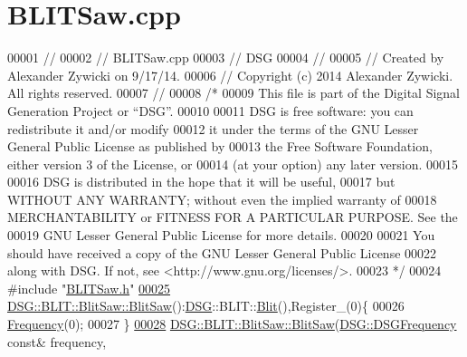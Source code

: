 \hypertarget{_b_l_i_t_saw_8cpp_source}{\section{B\+L\+I\+T\+Saw.\+cpp}
\label{_b_l_i_t_saw_8cpp_source}
}

\begin{DoxyCode}
00001 \textcolor{comment}{//}
00002 \textcolor{comment}{//  BLITSaw.cpp}
00003 \textcolor{comment}{//  DSG}
00004 \textcolor{comment}{//}
00005 \textcolor{comment}{//  Created by Alexander Zywicki on 9/17/14.}
00006 \textcolor{comment}{//  Copyright (c) 2014 Alexander Zywicki. All rights reserved.}
00007 \textcolor{comment}{//}
00008 \textcolor{comment}{/*}
00009 \textcolor{comment}{ This file is part of the Digital Signal Generation Project or “DSG”.}
00010 \textcolor{comment}{}
00011 \textcolor{comment}{ DSG is free software: you can redistribute it and/or modify}
00012 \textcolor{comment}{ it under the terms of the GNU Lesser General Public License as published by}
00013 \textcolor{comment}{ the Free Software Foundation, either version 3 of the License, or}
00014 \textcolor{comment}{ (at your option) any later version.}
00015 \textcolor{comment}{}
00016 \textcolor{comment}{ DSG is distributed in the hope that it will be useful,}
00017 \textcolor{comment}{ but WITHOUT ANY WARRANTY; without even the implied warranty of}
00018 \textcolor{comment}{ MERCHANTABILITY or FITNESS FOR A PARTICULAR PURPOSE.  See the}
00019 \textcolor{comment}{ GNU Lesser General Public License for more details.}
00020 \textcolor{comment}{}
00021 \textcolor{comment}{ You should have received a copy of the GNU Lesser General Public License}
00022 \textcolor{comment}{ along with DSG.  If not, see <http://www.gnu.org/licenses/>.}
00023 \textcolor{comment}{ */}
00024 \textcolor{preprocessor}{#include "\hyperlink{_b_l_i_t_saw_8h}{BLITSaw.h}"}
\hypertarget{_b_l_i_t_saw_8cpp_source_l00025}{}\hyperlink{class_d_s_g_1_1_b_l_i_t_1_1_blit_saw_a5c73a4aeb4df74da4db4896edeb15059}{00025} \hyperlink{class_d_s_g_1_1_b_l_i_t_1_1_blit_saw_a5c73a4aeb4df74da4db4896edeb15059}{DSG::BLIT::BlitSaw::BlitSaw}():\hyperlink{namespace_d_s_g}{DSG}::BLIT::\hyperlink{class_d_s_g_1_1_b_l_i_t_1_1_blit}{Blit}(),Register\_(0)\{
00026     \hyperlink{class_d_s_g_1_1_phasor_a6bdec1d2722e2fa5c7173ac5f7adf682}{Frequency}(0);
00027 \}
\hypertarget{_b_l_i_t_saw_8cpp_source_l00028}{}\hyperlink{class_d_s_g_1_1_b_l_i_t_1_1_blit_saw_a3d7e4379c00970fa89085ed2c945a2b7}{00028} \hyperlink{class_d_s_g_1_1_b_l_i_t_1_1_blit_saw_a5c73a4aeb4df74da4db4896edeb15059}{DSG::BLIT::BlitSaw::BlitSaw}(\hyperlink{namespace_d_s_g_a4315a061386fa1014fda09b15d3a6973}{DSG::DSGFrequency} \textcolor{keyword}{const}& frequency,

\end{DoxyCode}
